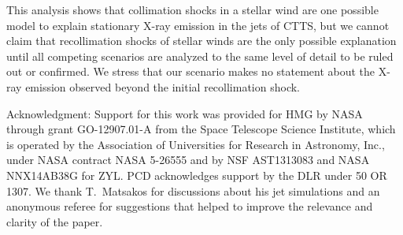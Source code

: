 \documentclass{emulateapj}
\begin{document}
This analysis shows that collimation shocks in a stellar wind are one possible model to explain stationary X-ray emission in the jets of CTTS, but we cannot claim that recollimation shocks of stellar winds are the only possible explanation until all competing scenarios are analyzed to the same level of detail to be ruled out or confirmed. We stress that our scenario makes no statement about the X-ray emission observed beyond the initial recollimation shock.




Acknowledgment: 
Support for this work was provided for HMG by NASA through grant GO-12907.01-A from the Space Telescope Science Institute, which is operated by the Association of Universities for Research in Astronomy, Inc., under NASA contract NASA 5-26555 and by NSF AST1313083 and NASA NNX14AB38G for ZYL. PCD acknowledges support by the DLR under 50 OR 1307. We thank T.~Matsakos for discussions about his jet simulations and an anonymous referee for suggestions that helped to improve the relevance and clarity of the paper.


\end{document}
